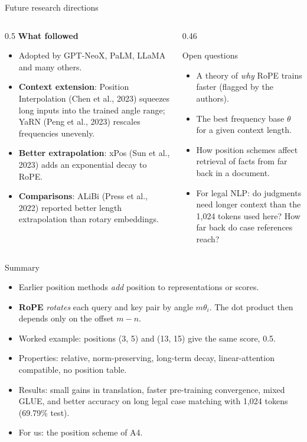 \documentclass[aspectratio=169,11pt]{beamer}
\begin{document}
\begin{frame}{Future research directions}
  \begin{columns}[T]
    \begin{column}{0.5\textwidth}
      \small
      \textbf{What followed}
      \begin{itemize}
        \item Adopted by GPT-NeoX, PaLM, LLaMA and many others.
        \item \textbf{Context extension}: Position Interpolation (Chen et al., 2023) squeezes long inputs into the trained angle range; YaRN (Peng et al., 2023) rescales frequencies unevenly.
        \item \textbf{Better extrapolation}: xPos (Sun et al., 2023) adds an exponential decay to RoPE.
        \item \textbf{Comparisons}: ALiBi (Press et al., 2022) reported better length extrapolation than rotary embeddings.
      \end{itemize}
    \end{column}
    \begin{column}{0.46\textwidth}
      \begin{block}{Open questions}
        \small
        \begin{itemize}
          \item A theory of \emph{why} RoPE trains faster (flagged by the authors).
          \item The best frequency base $\theta$ for a given context length.
          \item How position schemes affect retrieval of facts from far back in a document.
          \item For legal NLP: do judgments need longer context than the 1,024 tokens used here? How far back do case references reach?
        \end{itemize}
      \end{block}
    \end{column}
  \end{columns}
\end{frame}

\begin{frame}{Summary}
  \begin{itemize}
    \item Earlier position methods \emph{add} position to representations or scores.
    \item \textbf{RoPE} \emph{rotates} each query and key pair by angle $m\theta_i$. The dot product then depends only on the offset $m-n$.
    \item Worked example: positions (3, 5) and (13, 15) give the same score, 0.5.
    \item Properties: relative, norm-preserving, long-term decay, linear-attention compatible, no position table.
    \item Results: small gains in translation, faster pre-training convergence, mixed GLUE, and better accuracy on long legal case matching with 1,024 tokens (69.79\% test).
    \item For us: the position scheme of A4.
  \end{itemize}
\end{frame}
\end{document}
